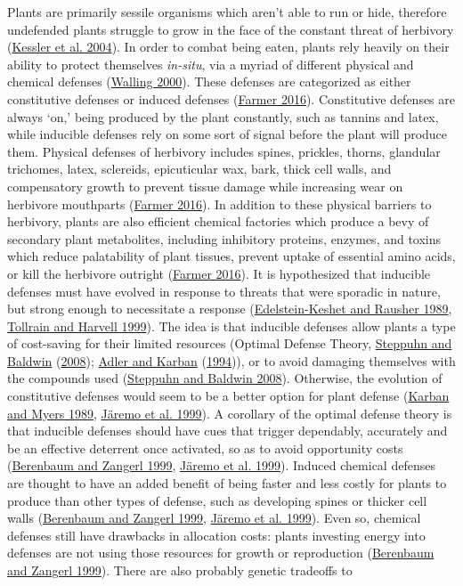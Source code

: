 \documentclass[12pt,final,CPage]{ufthesis}
\begin{document}
{  Plants are primarily sessile organisms which aren't able to run or hide, therefore undefended plants struggle to grow in the face of the constant threat of herbivory (\protect\hyperlink{ref-Kessler2004}{Kessler et al. 2004}). In order to combat being eaten, plants rely heavily on their ability to protect themselves \emph{in-situ}, via a myriad of different physical and chemical defenses (\protect\hyperlink{ref-Walling2000}{Walling 2000}). These defenses are categorized as either constitutive defenses or induced defenses (\protect\hyperlink{ref-Farmer2016}{Farmer 2016}). Constitutive defenses are always `on,' being produced by the plant constantly, such as tannins and latex, while inducible defenses rely on some sort of signal before the plant will produce them. Physical defenses of herbivory includes spines, prickles, thorns, glandular trichomes, latex, sclereids, epicuticular wax, bark, thick cell walls, and compensatory growth to prevent tissue damage while increasing wear on herbivore mouthparts (\protect\hyperlink{ref-Farmer2016}{Farmer 2016}). In addition to these physical barriers to herbivory, plants are also efficient chemical factories which produce a bevy of secondary plant metabolites, including inhibitory proteins, enzymes, and toxins which reduce palatability of plant tissues, prevent uptake of essential amino acids, or kill the herbivore outright (\protect\hyperlink{ref-Farmer2016}{Farmer 2016}). It is hypothesized that inducible defenses must have evolved in response to threats that were sporadic in nature, but strong enough to necessitate a response (\protect\hyperlink{ref-EdelsteinKeshet1989}{Edelstein-Keshet and Rausher 1989}, \protect\hyperlink{ref-Tollrian1999}{Tollrain and Harvell 1999}). The idea is that inducible defenses allow plants a type of cost-saving for their limited resources (Optimal Defense Theory, \protect\hyperlink{ref-Steppuhn2008}{Steppuhn and Baldwin} (\protect\hyperlink{ref-Steppuhn2008}{2008}); \protect\hyperlink{ref-Adler1994}{Adler and Karban} (\protect\hyperlink{ref-Adler1994}{1994})), or to avoid damaging themselves with the compounds used (\protect\hyperlink{ref-Steppuhn2008}{Steppuhn and Baldwin 2008}). Otherwise, the evolution of constitutive defenses would seem to be a better option for plant defense (\protect\hyperlink{ref-Karban1989}{Karban and Myers 1989}, \protect\hyperlink{ref-Jaeremo1999}{Järemo et al. 1999}). A corollary of the optimal defense theory is that inducible defenses should have cues that trigger dependably, accurately and be an effective deterrent once activated, so as to avoid opportunity costs (\protect\hyperlink{ref-Berenbaum1999}{Berenbaum and Zangerl 1999}, \protect\hyperlink{ref-Jaeremo1999}{Järemo et al. 1999}). Induced chemical defenses are thought to have an added benefit of being faster and less costly for plants to produce than other types of defense, such as developing spines or thicker cell walls (\protect\hyperlink{ref-Berenbaum1999}{Berenbaum and Zangerl 1999}, \protect\hyperlink{ref-Jaeremo1999}{Järemo et al. 1999}). Even so, chemical defenses still have drawbacks in allocation costs: plants investing energy into defenses are not using those resources for growth or reproduction (\protect\hyperlink{ref-Berenbaum1999}{Berenbaum and Zangerl 1999}). There are also probably genetic tradeoffs to }
\end{document}
